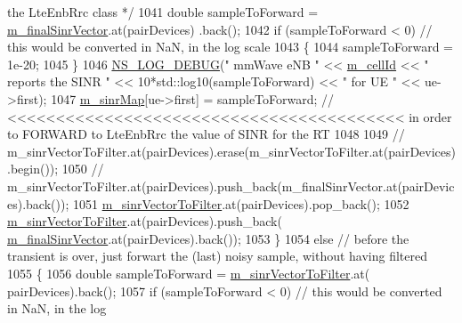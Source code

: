 \begin{DoxyCode}
{       the LteEnbRrc class */}
1041                                 \textcolor{keywordtype}{double} sampleToForward = \hyperlink{classns3_1_1MmWaveEnbPhy_a6c34c832c1bcb05fab00a4435cc499d0}{m\_finalSinrVector}.at(pairDevices)
      .back(); 
1042                                 \textcolor{keywordflow}{if} (sampleToForward < 0) \textcolor{comment}{// this would be converted in NaN, in the log
       scale}
1043                                 \{
1044                                         sampleToForward = 1e-20;
1045                                 \}
1046                                 \hyperlink{group__logging_ga413f1886406d49f59a6a0a89b77b4d0a}{NS\_LOG\_DEBUG}(\textcolor{stringliteral}{" mmWave eNB "} << 
      \hyperlink{classns3_1_1MmWavePhy_a0594531da45f93220d4f5de292bae823}{m\_cellId} << \textcolor{stringliteral}{" reports the SINR "} << 10*std::log10(sampleToForward) << \textcolor{stringliteral}{" for UE "} << ue->first);
1047                                 \hyperlink{classns3_1_1MmWaveEnbPhy_a754de7cf4bdbe107dfb006a5b332842a}{m\_sinrMap}[ue->first] = sampleToForward; \textcolor{comment}{//
       <<<<<<<<<<<<<<<<<<<<<<<<<<<<<<<<<<<<<<<<< in order to FORWARD to LteEnbRrc the value of SINR for the RT}
1048 
1049                                 \textcolor{comment}{//
      m\_sinrVectorToFilter.at(pairDevices).erase(m\_sinrVectorToFilter.at(pairDevices).begin());}
1050                                 \textcolor{comment}{//
      m\_sinrVectorToFilter.at(pairDevices).push\_back(m\_finalSinrVector.at(pairDevices).back());}
1051                                 \hyperlink{classns3_1_1MmWaveEnbPhy_a2887e6ce935c6d25fc2759269b811bbe}{m\_sinrVectorToFilter}.at(pairDevices).pop\_back();
1052                                 \hyperlink{classns3_1_1MmWaveEnbPhy_a2887e6ce935c6d25fc2759269b811bbe}{m\_sinrVectorToFilter}.at(pairDevices).push\_back(
      \hyperlink{classns3_1_1MmWaveEnbPhy_a6c34c832c1bcb05fab00a4435cc499d0}{m\_finalSinrVector}.at(pairDevices).back());
1053                         \}
1054                         \textcolor{keywordflow}{else} \textcolor{comment}{// before the transient is over, just forwart the (last) noisy sample, without
       having filtered}
1055                         \{
1056                                 \textcolor{keywordtype}{double} sampleToForward = \hyperlink{classns3_1_1MmWaveEnbPhy_a2887e6ce935c6d25fc2759269b811bbe}{m\_sinrVectorToFilter}.at(
      pairDevices).back();
1057                                 \textcolor{keywordflow}{if} (sampleToForward < 0) \textcolor{comment}{// this would be converted in NaN, in the log
}
\end{DoxyCode}
